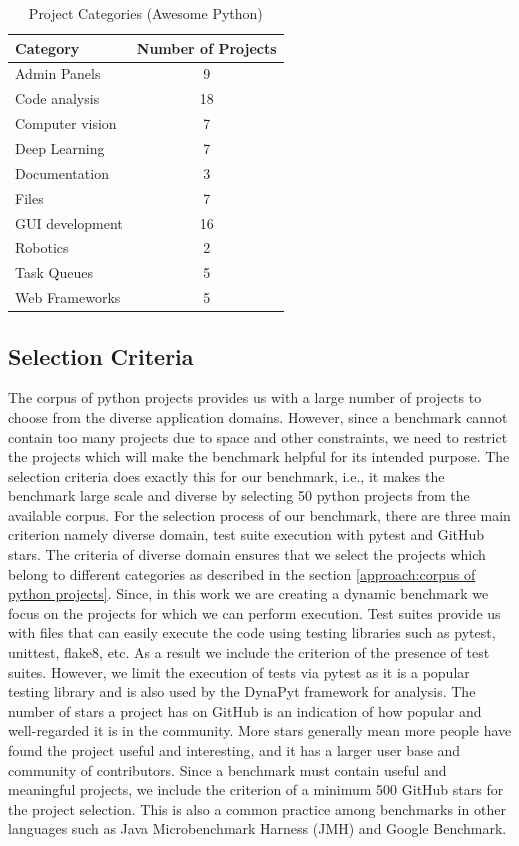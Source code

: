 \begin{table}[ht]
    \centering
    \begin{tabular}{lc}
    \hline
    \textbf{Category} & \textbf{Number of Projects}\\
    \hline
    Admin Panels    & 9\\
    Code analysis   & 18\\
    Computer vision & 7\\
    Deep Learning   & 7\\
    Documentation   & 3\\
    Files   & 7\\
    GUI development & 16\\
    Robotics    & 2\\
    Task Queues & 5\\
    Web Frameworks  & 5\\
    \hline
    \end{tabular}
    \caption{Project Categories (Awesome Python)}
    \label{table:awesome-python}
\end{table}

\subsection{Selection Criteria}
\label{approach:selection criteria}
The corpus of python projects provides us with a large number of projects to choose from the diverse application domains.
However, since a benchmark cannot contain too many projects due to space and other constraints, we need to restrict the projects which will make the benchmark helpful for its intended purpose.   
The selection criteria does exactly this for our benchmark, i.e., it makes the benchmark large scale and diverse by selecting 50 python projects from the available corpus.
For the selection process of our benchmark, there are three main criterion namely diverse domain, test suite execution with pytest and GitHub stars.
The criteria of diverse domain ensures that we select the projects which belong to different categories as described in the section \ref{approach:corpus of python projects}.
Since, in this work we are creating a dynamic benchmark we focus on the projects for which we can perform execution. Test suites provide us with files that can easily execute the code using testing libraries such as pytest, unittest, flake8, etc. As a result we include the criterion of the presence of test suites. However, we limit the execution of tests via pytest as it is a popular testing library and is also used by the DynaPyt framework for analysis.
The number of stars a project has on GitHub is an indication of how popular and well-regarded it is in the community. More stars generally mean more people have found the project useful and interesting, and it has a larger user base and community of contributors. Since a benchmark must contain useful and meaningful projects, we include the criterion of a minimum 500 GitHub stars for the project selection. This is also a common practice among benchmarks in other languages such as Java Microbenchmark Harness (JMH) and Google Benchmark. 

